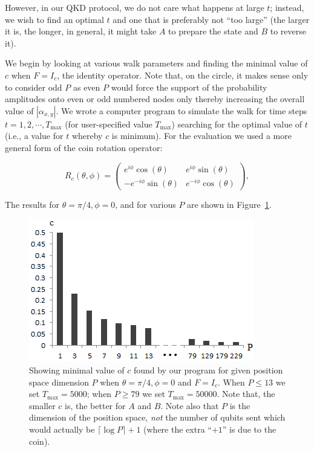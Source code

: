 However, in our QKD protocol, we do not care what happens at large $t$; instead, we wish to find an optimal $t$ and one that is preferably not ``too large'' (the larger it is, the longer, in general, it might take $A$ to prepare the state and $B$ to reverse it).

We begin by looking at various walk parameters and finding the minimal value of $c$ when $F=I_c$, the identity operator. Note that, on the circle, it makes sense only to consider odd $P$ as even $P$ would force the support of the probability amplitudes onto even or odd numbered nodes only thereby increasing the overall value of $|\alpha_{x,y}|$. We wrote a computer program to simulate the walk for time steps $t = 1, 2,\cdots , T_{\text{max}}$ (for user-specified value $T_{\text{max}}$) searching for the optimal value of $t$ (i.e., a value for $t$ whereby $c$ is minimum). For the evaluation we used a more general form of the coin rotation operator:

\begin{equation*}
R_c(\theta,\phi) = 	\left( 
				\begin{array}{cc}
					e^{i\phi} \cos(\theta) & e^{i\phi} \sin(\theta) \\
					-e^{-i\phi} \sin(\theta)& e^{-i\phi} \cos(\theta)
				\end{array}
			\right),
\end{equation*}

The results for $\theta = \pi/4, \phi = 0$, and for various $P$ are shown in Figure~\ref{fig:prot1:cvals}.
	
\begin{figure}[h!]
  \centering
  \includegraphics[scale = 0.6]{overlap-piover4.png}
\caption{Showing minimal value of $c$ found by our program for given position space dimension $P$ when $\theta = \pi / 4,\phi=0$ and $F=I_c$.  When $P \le 13$ we set $T_{\max} = 5000$; when $P \ge 79$ we set $T_{\max} = 50000$.  Note that, the smaller $c$ is, the better for $A$ and $B$.  Note also that $P$ is the dimension of the position space, \emph{not} the number of qubits sent which would actually be $\lceil\log P\rceil+1$ (where the extra ``$+1$'' is due to the coin).}\label{fig:prot1:cvals}
\end{figure}


